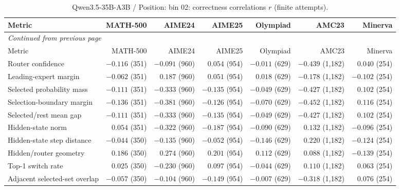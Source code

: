 \begingroup\scriptsize\setlength{\tabcolsep}{4pt}
\begin{longtable}{@{}lrrrrrr@{}}
\caption{Qwen3.5-35B-A3B / Position: bin 02: correctness correlations $r$ (finite attempts).}\label{tab:multi-qwen-position-bin_02}\\
\toprule
Metric & MATH-500 & AIME24 & AIME25 & Olympiad & AMC23 & Minerva \\
\midrule\endfirsthead
\multicolumn{7}{l}{\textit{Continued from previous page}}\\
\toprule
Metric & MATH-500 & AIME24 & AIME25 & Olympiad & AMC23 & Minerva \\
\midrule\endhead
\bottomrule\endfoot
Router confidence & $-0.116$ (351) & $-0.091$ (960) & $0.054$ (954) & $-0.011$ (629) & $-0.439$ (1,182) & $0.040$ (254) \\
Leading-expert margin & $-0.062$ (351) & $0.187$ (960) & $0.051$ (954) & $0.018$ (629) & $-0.178$ (1,182) & $-0.102$ (254) \\
Selected probability mass & $-0.111$ (351) & $-0.333$ (960) & $-0.135$ (954) & $-0.049$ (629) & $-0.427$ (1,182) & $0.102$ (254) \\
Selection-boundary margin & $-0.136$ (351) & $-0.381$ (960) & $-0.126$ (954) & $-0.070$ (629) & $-0.452$ (1,182) & $0.116$ (254) \\
Selected/rest mean gap & $-0.111$ (351) & $-0.333$ (960) & $-0.135$ (954) & $-0.049$ (629) & $-0.427$ (1,182) & $0.102$ (254) \\
Hidden-state norm & $0.054$ (351) & $-0.322$ (960) & $-0.187$ (954) & $-0.090$ (629) & $0.132$ (1,182) & $-0.096$ (254) \\
Hidden-state step distance & $-0.044$ (350) & $-0.135$ (960) & $-0.052$ (954) & $-0.146$ (629) & $0.220$ (1,182) & $-0.124$ (254) \\
Hidden/router geometry & $0.186$ (350) & $0.274$ (960) & $0.201$ (954) & $0.112$ (629) & $0.088$ (1,182) & $-0.139$ (254) \\
Top-1 switch rate & $0.025$ (350) & $-0.230$ (960) & $0.097$ (954) & $-0.044$ (629) & $0.110$ (1,182) & $0.063$ (254) \\
Adjacent selected-set overlap & $-0.057$ (350) & $-0.104$ (960) & $-0.149$ (954) & $-0.007$ (629) & $-0.318$ (1,182) & $0.076$ (254) \\
\end{longtable}\endgroup

